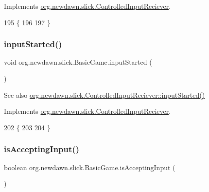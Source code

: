 Implements \mbox{\hyperlink{interfaceorg_1_1newdawn_1_1slick_1_1_controlled_input_reciever_a61c6cde7cbf28a6969cafe3ec4f1c121}{org.\+newdawn.\+slick.\+Controlled\+Input\+Reciever}}.


\begin{DoxyCode}
195                              \{
196         
197     \}
\end{DoxyCode}
\mbox{\label{classorg_1_1newdawn_1_1slick_1_1_basic_game_aa04bcb9e5c8687d7cc6ba05a63b93b40}} 
\subsubsection{\texorpdfstring{input\+Started()}{inputStarted()}}
{\footnotesize\ttfamily void org.\+newdawn.\+slick.\+Basic\+Game.\+input\+Started (\begin{DoxyParamCaption}{ }\end{DoxyParamCaption})\hspace{0.3cm}{\ttfamily [inline]}}

\begin{DoxySeeAlso}{See also}
\mbox{\hyperlink{interfaceorg_1_1newdawn_1_1slick_1_1_controlled_input_reciever_a718de21e9cd22f4c48ee87b5b8b32ed6}{org.\+newdawn.\+slick.\+Controlled\+Input\+Reciever\+::input\+Started()}} 
\end{DoxySeeAlso}


Implements \mbox{\hyperlink{interfaceorg_1_1newdawn_1_1slick_1_1_controlled_input_reciever_a718de21e9cd22f4c48ee87b5b8b32ed6}{org.\+newdawn.\+slick.\+Controlled\+Input\+Reciever}}.


\begin{DoxyCode}
202                                \{
203         
204     \}
\end{DoxyCode}
\mbox{\label{classorg_1_1newdawn_1_1slick_1_1_basic_game_a435f5bb90065a05563b04b715f02891e}} 
\subsubsection{\texorpdfstring{is\+Accepting\+Input()}{isAcceptingInput()}}
{\footnotesize\ttfamily boolean org.\+newdawn.\+slick.\+Basic\+Game.\+is\+Accepting\+Input (\begin{DoxyParamCaption}{ }\end{DoxyParamCaption})\hspace{0.3cm}{\ttfamily [inline]}}

